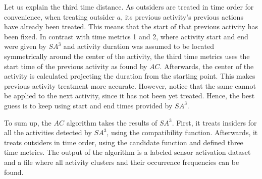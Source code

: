 Let us explain the third time distance. As outsiders are treated in time order for convenience, when treating outsider $a$, its previous activity's previous actions have already been treated. This means that the start of that previous activity has been fixed. In contrast with time metrics 1 and 2, where activity start and end were given by $SA^3$ and activity duration was assumed to be located symmetrically around the center of the activity, the third time metrics uses the start time of the previous activity as found by $AC$. Afterwards, the center of the activity is calculated projecting the duration from the starting point. This makes previous activity treatment more accurate. However, notice that the same cannot be applied to the next activity, since it has not been yet treated. Hence, the best guess is to keep using start and end times provided by $SA^3$.

To sum up, the $AC$ algorithm takes the results of $SA^3$. First, it treats insiders for all the activities detected by $SA^3$, using the compatibility function. Afterwards, it treats outsiders in time order, using the candidate function and defined three time metrics. The output of the algorithm is a labeled sensor activation dataset and a file where all activity clusters and their occurrence frequencies can be found. %